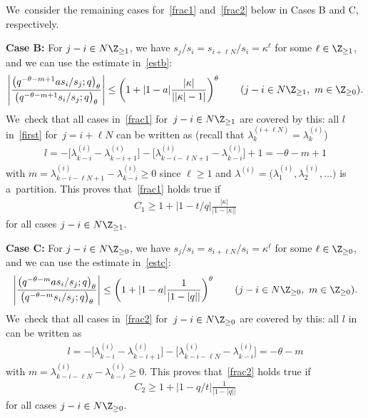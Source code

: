 We~consider the remaining cases for~\eqref{frac1} and~\eqref{frac2} below in Cases B and C, respectively.

{\bf Case B:} For $j-i\in N\Z_{\geq 1}$, we have $s_j/s_i = s_{i+\ell N}/s_i=\kappa^\ell$ for some $\ell\in\Z_{\geq 1}$, and we can use the estimate in~\eqref{estb}:
\begin{gather*}
\left|\frac{\big(q^{-\theta-m+1}as_i/s_j;q\big)_\theta}{\big(q^{-\theta-m+1} s_i/s_j;q\big)_\theta}\right|\leq \left(1+|1-a|\frac{|\kappa|}{||\kappa|-1|} \right)^\theta\qquad
(j-i\in N\Z_{\geq 1},\ m\in\Z_{\geq 0}).
\end{gather*}
We~check that all cases in~\eqref{frac1} for~$j-i\in N\Z_{\geq 1}$ are covered by this: all $l$ in~\eqref{first} for~$j=i+\ell N$ can be written as (recall that $\lambda^{(i+\ell N)}_k=\lambda^{(i)}_k$)
\begin{gather*}
l = -\big[\lambda^{(i)}_{k-i}- \lambda^{(i)}_{k-i+1}\big] - \big[\lambda^{(i)}_{k-i-\ell N+1}-\lambda^{(i)}_{k-i}\big]+1 = -\theta-m+1
\end{gather*}
with $m=\lambda^{(i)}_{k-i-\ell N+1}-\lambda^{(i)}_{k-i}\geq 0$ since $\ell\geq 1$ and $\lambda^{(i)}=\big(\lambda_1^{(i)},\lambda_2^{(i)},\dots\big)$ is a~partition.
This proves that~\eqref{frac1} holds true if
\begin{gather}
\label{C1C2B}
C_1\geq 1+|1-t/q|\frac{|\kappa|}{|1-|\kappa||}
\end{gather}
for all cases $j-i\in N\Z_{\geq 1}$.

{\bf Case C:} For $j-i\in N\Z_{\geq 0}$, we have $s_j/s_i = s_{i+\ell N}/s_i=\kappa^\ell$ for some $\ell\in\Z_{\geq 0}$, and we can use the estimate in~\eqref{estc}:
\begin{gather*}
\left|\frac{\big(q^{-\theta-m}as_i/s_j;q\big)_\theta}{\big(q^{-\theta-m} s_i/s_j;q\big)_\theta}\right|\leq \left(1+|1-a|\frac{1}{|1-|q||} \right)^\theta\qquad
(j-i\in N\Z_{\geq 0},\ m\in\Z_{\geq 0}).
\end{gather*}
We~check that all cases in~\eqref{frac2} for~$j-i\in N\Z_{\geq 0}$ are covered by this: all $l$ in can be written as
\begin{gather*}
l=-\big[\lambda^{(i)}_{k-i}-\lambda^{(i)}_{k-i+1}\big]-\big[\lambda^{(i)}_{k-i-\ell N}-\lambda^{(i)}_{k-i}\big] = -\theta-m
\end{gather*}
with $m=\lambda^{(i)}_{k-i-\ell N}-\lambda^{(i)}_{k-i}\geq 0$.
This proves that~\eqref{frac2} holds true if
\begin{gather}\label{C1C2C}
C_2\geq 1+|1-q/t|\frac{1}{|1-|q||}
\end{gather}
for all cases $j-i\in N\Z_{\geq 0}$.

